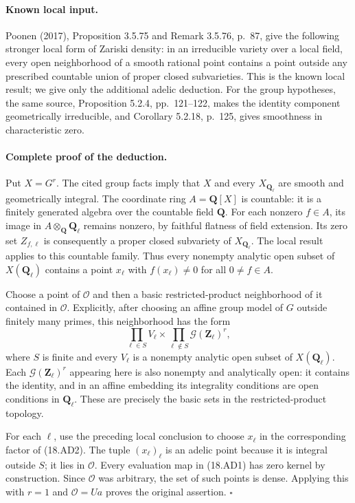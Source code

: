\documentclass[11pt,a4paper]{article}
\theoremstyle{definition}\newtheorem{definition}[theorem]{Definition}
\theoremstyle{remark}\newtheorem{remark}[theorem]{Remark}
\begin{document}
\paragraph{Known local input.}
Poonen (2017), Proposition 3.5.75 and Remark 3.5.76, p.~87,
give the following stronger local form of Zariski density: in an
irreducible variety over a local field, every open neighborhood of
a smooth rational point contains a point outside any prescribed
countable union of proper closed subvarieties.  This is the known
local result; we give only the additional adelic deduction.
For the group hypotheses, the same source, Proposition 5.2.4,
pp.~121--122, makes the identity component geometrically
irreducible, and Corollary 5.2.18, p.~125, gives smoothness in
characteristic zero.

\paragraph{Complete proof of the deduction.}
Put \(X=G^r\).  The cited group facts imply that \(X\) and every
\(X_{\mathbf Q_\ell}\) are smooth and geometrically integral.
The coordinate ring \(A=\mathbf Q[X]\) is countable: it is a
finitely generated algebra over the countable field \(\mathbf Q\).
For each nonzero \(f\in A\), its image in
\(A\otimes_{\mathbf Q}\mathbf Q_\ell\) remains nonzero, by
faithful flatness of field extension.  Its zero set
\(Z_{f,\ell}\) is consequently a proper closed subvariety of
\(X_{\mathbf Q_\ell}\).  The local result applies to this
countable family.  Thus every nonempty analytic open subset of
\(X(\mathbf Q_\ell)\) contains a point \(x_\ell\) with
\(f(x_\ell)\ne0\) for all \(0\ne f\in A\).

Choose a point of \(\mathcal O\) and then a basic restricted-product
neighborhood of it contained in \(\mathcal O\).  Explicitly, after
choosing an affine group model of \(G\) outside finitely many
primes, this neighborhood has the form
\[
       \prod_{\ell\in S}V_\ell
          \times\prod_{\ell\notin S}\mathcal G(\mathbf Z_\ell)^r,
 \tag{18.AD2}
\]
where \(S\) is finite and every \(V_\ell\) is a nonempty
analytic open subset of \(X(\mathbf Q_\ell)\).
Each \(\mathcal G(\mathbf Z_\ell)^r\) appearing here is also
nonempty and analytically open: it contains the identity, and in
an affine embedding its integrality conditions are open conditions
in \(\mathbf Q_\ell\).  These are precisely the basic sets in
the restricted-product topology.

For each \(\ell\), use the preceding local conclusion to choose
\(x_\ell\) in the corresponding factor of (18.AD2).  The tuple
\((x_\ell)_\ell\) is an adelic point because it is integral
outside \(S\); it lies in \(\mathcal O\).  Every evaluation map
in (18.AD1) has zero kernel by construction.  Since
\(\mathcal O\) was arbitrary, the set of such points is dense.
Applying this with \(r=1\) and \(\mathcal O=Ua\) proves the
original assertion. \(\square\)
\end{document}
